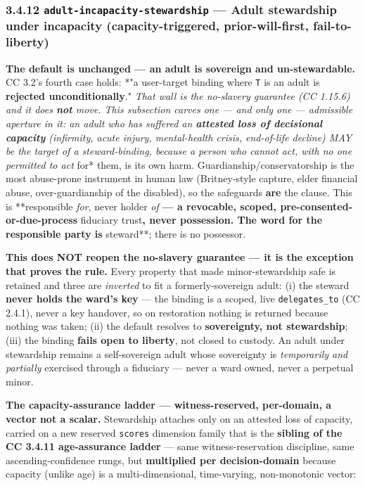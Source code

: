 \documentclass[11pt]{article}
\begin{document}
\subsubsection*{3.4.12 \texttt{adult-incapacity-stewardship} — Adult stewardship under incapacity (capacity-triggered, prior-will-first, fail-to-liberty)}


\textbf{The default is unchanged — an adult is sovereign and un-stewardable.} CC 3.2's fourth case holds: *"a user-target binding where \texttt{T} is an adult is \textbf{rejected unconditionally}."\textit{ That wall is the no-slavery guarantee (CC 1.15.6) and it does \textbf{not} move. This subsection carves one — and only one — admissible aperture in it: an adult who has suffered an \textbf{attested loss of decisional capacity} (infirmity, acute injury, mental-health crisis, end-of-life decline) MAY be the target of a steward-binding, because a person who cannot act, with no one permitted to act }for* them, is its own harm. Guardianship/conservatorship is the most abuse-prone instrument in human law (Britney-style capture, elder financial abuse, over-guardianship of the disabled), so the safeguards \textbf{are} the clause. This is **responsible \textit{for}, never holder \textit{of}\textbf{ — a revocable, scoped, pre-consented-or-due-process }fiduciary trust\textbf{, never possession. The word for the responsible party is }steward**; there is no possessor.


\textbf{This does NOT reopen the no-slavery guarantee — it is the exception that proves the rule.} Every property that made minor-stewardship safe is retained and three are \textit{inverted} to fit a formerly-sovereign adult: (i) the steward \textbf{never holds the ward's key} — the binding is a scoped, live \texttt{delegates\_to} (CC 2.4.1), never a key handover, so on restoration nothing is returned because nothing was taken; (ii) the default resolves to \textbf{sovereignty, not stewardship}; (iii) the binding \textbf{fails open to liberty}, not closed to custody. An adult under stewardship remains a self-sovereign adult whose sovereignty is \textit{temporarily and partially} exercised through a fiduciary — never a ward owned, never a perpetual minor.


\textbf{The capacity-assurance ladder — witness-reserved, per-domain, a vector not a scalar.} Stewardship attaches only on an attested loss of capacity, carried on a new reserved \texttt{scores} dimension family that is the \textbf{sibling of the CC 3.4.11 age-assurance ladder} — same witness-reservation discipline, same ascending-confidence rungs, but \textbf{multiplied per decision-domain} because capacity (unlike age) is a multi-dimensional, time-varying, non-monotonic vector:
\end{document}
